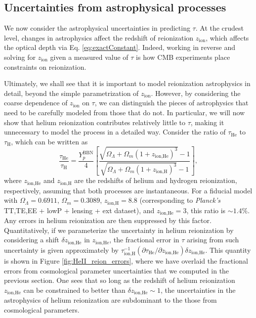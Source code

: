 \documentclass[twocolumn,aps,prd,nofootinbib,showpacs]{revtex4-1}
\begin{document}
\subsection{Uncertainties from astrophysical processes}
\label{sec:astroUncertainties}

We now consider the astrophysical uncertainties in predicting $\tau$. At the crudest level, changes in astrophysics affect the redshift of reionization $z_\textrm{ion}$, which affects the optical depth via Eq. \eqref{eq:exactConstant}. Indeed, working in reverse and solving for $z_\textrm{ion}$ given a measured value of $\tau$ is how CMB experiments place constraints on reionization.

Ultimately, we shall see that it is important to model reionization astrophysics in detail, beyond the simple parametrization of $z_\textrm{ion}$. However, by considering the coarse dependence of $z_\textrm{ion}$ on $\tau$, we can distinguish the pieces of astrophysics that need to be carefully modeled from those that do not. In particular, we will now show that helium reionization contributes relatively little to $\tau$, making it unnecessary to model the process in a detailed way. Consider the ratio of $\tau_\textrm{He}$ to $\tau_\textrm{H}$, which can be written as
\begin{equation}
\frac{\tau_\textrm{He}}{\tau_\textrm{H}} = \frac{Y_p^\textrm{BBN}}{4} \left[ \frac{ \sqrt{\Omega_\Lambda + \Omega_m (1+z_\textrm{ion,He})^3} - 1}{ \sqrt{\Omega_\Lambda + \Omega_m (1+z_\textrm{ion,H})^3} - 1}\right],
\end{equation}
where $z_\textrm{ion,He}$ and $z_\textrm{ion,H}$ are the redshifts of helium and hydrogen reionization, respectively, assuming that both processes are instantaneous. For a fiducial model with $\Omega_\Lambda = 0.6911$, $\Omega_m = 0.3089$, $z_\textrm{ion,H} = 8.8$ (corresponding to \emph{Planck's} TT,TE,EE + lowP + lensing + ext dataset), and $z_\textrm{ion,He} = 3$, this ratio is $\sim 1.4\%$. Any errors in helium reionization are then suppressed by this factor. Quantitatively, if we parameterize the uncertainty in helium reionization by considering a shift $\delta z_\textrm{ion,He}$ in $z_\textrm{ion,He}$, the fractional error in $\tau$ arising from such uncertainty is given approximately by $\tau_\textrm{ion,H}^{-1} (\partial \tau_\textrm{He} / \partial z_\textrm{ion,He}) \delta z_\textrm{ion,He}$. This quantity is shown in Figure \ref{fig:HeII_reion_errors}, where we have overlaid the fractional errors from cosmological parameter uncertainties that we computed in the previous section. One sees that so long as the redshift of helium reionization $z_\textrm{ion,He}$ can be constrained to better than $ \delta z_\textrm{ion,He} \sim 1$, the uncertainties in the astrophysics of helium reionization are subdominant to the those from cosmological parameters.
\end{document}
